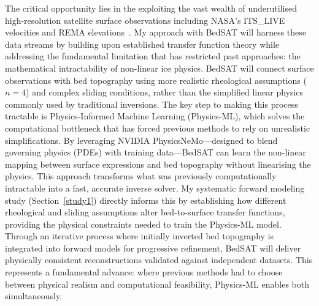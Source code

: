 The critical opportunity lies in the exploiting the vast wealth of underutilised high-resolution satellite surface observations including NASA's ITS\_LIVE~\cite{itslive} velocities and REMA elevations~\cite{REMA}. My approach with BedSAT will harness these data streams by building upon established transfer function theory while addressing the fundamental limitation that has restricted past approaches: the mathematical intractability of non-linear ice physics. BedSAT will connect surface observations with bed topography using more realistic rheological assumptions ($n = 4$) and complex sliding conditions, rather than the simplified linear physics commonly used by traditional inversions. The key step to making this process tractable is Physics-Informed Machine Learning (Physics-ML), which solves the computational bottleneck that has forced previous methods to rely on unrealistic simplifications. By leveraging NVIDIA PhysicsNeMo—designed to blend governing physics (PDEs) with training data\cite{NVIDIA_NeMo_2025}—BedSAT can learn the non-linear mapping between surface expressions and bed topography without linearising the physics. This approach transforms what was previously computationally intractable into a fast, accurate inverse solver. My systematic forward modeling study (Section~\ref{study1}) directly informs this by establishing how different rheological and sliding assumptions alter bed-to-surface transfer functions, providing the physical constraints needed to train the Physics-ML model.
Through an iterative process where initially inverted bed topography is integrated into forward models for progressive refinement, BedSAT will deliver physically consistent reconstructions validated against independent datasets. This represents a fundamental advance: where previous methods had to choose between physical realism and computational feasibility, Physics-ML enables both simultaneously.